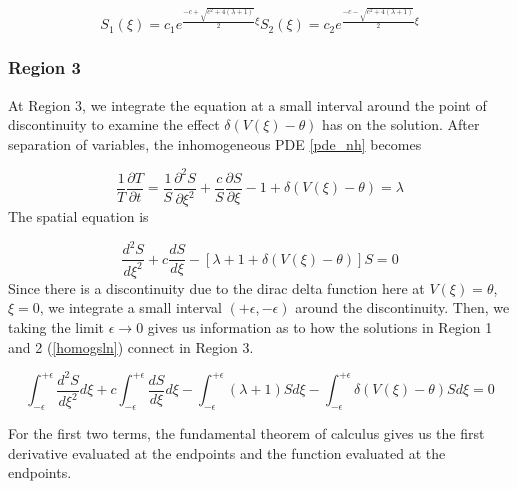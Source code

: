 \documentclass[12pt]{article}
\begin{document}
\begin{equation} \label{homogsln}
S_1(\xi) = c_1e^{\frac{-c+\sqrt{c^2+4(\lambda+1)}}{2}\xi}
S_2(\xi) = c_2e^{\frac{-c-\sqrt{c^2+4(\lambda+1)}}{2}\xi} 
\end{equation}

\subsubsection{Region 3}
At Region 3, we integrate the equation at a small interval around the point of discontinuity to examine the effect $\delta(V(\xi)-\theta)$ has on the solution. After separation of variables, the inhomogeneous PDE \ref{pde_nh} becomes

$$ \frac{1}{T}\frac{\partial T}{\partial t} = \frac{1}{S}\frac{\partial^2S}{\partial\xi^2} + \frac{c}{S}\frac{\partial S}{\partial\xi} - 1 + \delta(V(\xi)-\theta)= \lambda $$
The spatial equation is 

\begin{equation}\label{spatialdelta}
\frac{d^2S}{d\xi^2} + c\frac{dS}{d\xi} - [\lambda + 1 + \delta(V(\xi)-\theta)]S = 0
\end{equation} 
Since there is a discontinuity due to the dirac delta function here at $V(\xi) = \theta$, $\xi = 0$, we integrate a small interval $(+\epsilon,-\epsilon)$ around the discontinuity. Then, we taking the limit $\epsilon \to 0$ gives us information as to how the solutions in Region 1 and 2 (\ref{homogsln}) connect in Region 3.

$$ \int_{-\epsilon}^{+\epsilon}\frac{d^2S}{d\xi^2}d\xi + c\int_{-\epsilon}^{+\epsilon}\frac{dS}{d\xi}d\xi - \int_{-\epsilon}^{+\epsilon}(\lambda + 1)Sd\xi - \int_{-\epsilon}^{+\epsilon}\delta(V(\xi)-\theta)Sd\xi = 0 $$

For the first two terms, the fundamental theorem of calculus gives us the first derivative evaluated at the endpoints and the function evaluated at the endpoints.
\end{document}

